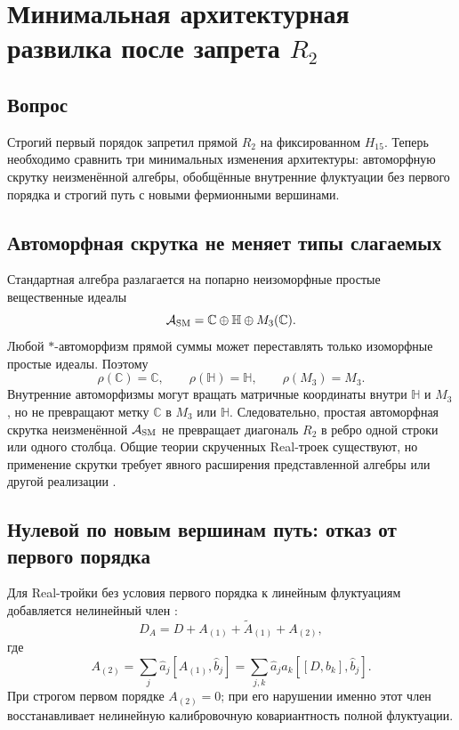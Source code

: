 \chapter{Минимальная архитектурная развилка после запрета \texorpdfstring{$R_2$}{R2}}
\label{ch:v7-r2-minimal-architecture-branch-gate}

\section{Вопрос}

Строгий первый порядок запретил прямой $R_2$ на фиксированном $H_{15}$.
Теперь необходимо сравнить три минимальных изменения архитектуры:
автоморфную скрутку неизменённой алгебры, обобщённые внутренние флуктуации
без первого порядка и строгий путь с новыми фермионными вершинами.

\section{Автоморфная скрутка не меняет типы слагаемых}

Стандартная алгебра разлагается на попарно неизоморфные простые вещественные
идеалы
\begin{equation}
 \mathcal A_{\rm SM}=\mathbb C\oplus\mathbb H\oplus M_3(\mathbb C).
 \label{eq:v7-r2-branch-simple-ideals}
\end{equation}
Любой $*$-автоморфизм прямой суммы может переставлять только изоморфные
простые идеалы. Поэтому
\begin{equation}
 \rho(\mathbb C)=\mathbb C,\qquad
 \rho(\mathbb H)=\mathbb H,\qquad
 \rho(M_3)=M_3.
 \label{eq:v7-r2-branch-automorphism-orbits}
\end{equation}
Внутренние автоморфизмы могут вращать матричные координаты внутри $\mathbb H$
и $M_3$, но не превращают метку $\mathbb C$ в $M_3$ или $\mathbb H$.
Следовательно, простая автоморфная скрутка неизменённой $\mathcal A_{\rm SM}$
не превращает диагональ $R_2$ в ребро одной строки или одного столбца.
Общие теории скрученных Real-троек существуют, но применение скрутки требует
явного расширения представленной алгебры или другой реализации
\cite{v7r2branch-landi,v7r2branch-grand}.

\section{Нулевой по новым вершинам путь: отказ от первого порядка}

Для Real-тройки без условия первого порядка к линейным флуктуациям добавляется
нелинейный член \cite{v7r2branch-generalized}:
\begin{equation}
 D_A=D+A_{(1)}+\widetilde A_{(1)}+A_{(2)},
 \label{eq:v7-r2-branch-generalized-dirac}
\end{equation}
где
\begin{equation}
 A_{(2)}=\sum_j\widehat a_j[A_{(1)},\widehat b_j]
 =\sum_{j,k}\widehat a_j a_k[[D,b_k],\widehat b_j].
 \label{eq:v7-r2-branch-quadratic-fluctuation}
\end{equation}
При строгом первом порядке $A_{(2)}=0$; при его нарушении именно этот член
восстанавливает нелинейную калибровочную ковариантность полной флуктуации.

